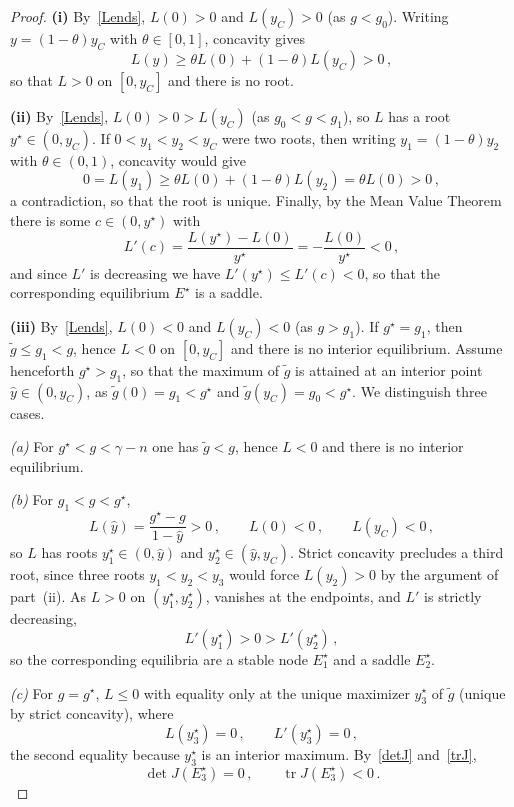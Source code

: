 \documentclass[10pt,a4paper]{amsart}
\begin{document}
\begin{proof}
{\bf (i)} By~\eqref{Lends}, $L(0)>0$ and $L(y_C)>0$ (as $g<g_0$). Writing $y=(1-\theta)y_C$ with $\theta\in[0,1]$, concavity gives
\[
L(y)\ge\theta L(0)+(1-\theta)L(y_C)>0\,,
\]
so that $L>0$ on $[0,y_C]$ and there is no root.

{\bf (ii)} By~\eqref{Lends}, $L(0)>0>L(y_C)$ (as $g_0<g<g_1$), so $L$ has a root $y^\star\in(0,y_C)$. If $0<y_1<y_2<y_C$ were two roots, then writing $y_1=(1-\theta)y_2$ with $\theta\in(0,1)$, concavity would give
\[
0=L(y_1)\ge\theta L(0)+(1-\theta)L(y_2)=\theta L(0)>0\,,
\]
a contradiction, so that the root is unique. Finally, by the Mean Value Theorem there is some $c\in(0,y^\star)$ with
\[
L'(c)=\frac{L(y^\star)-L(0)}{y^\star}=-\frac{L(0)}{y^\star}<0\,,
\]
and since $L'$ is decreasing we have $L'(y^\star)\le L'(c)<0$, so that the corresponding equilibrium $E^\star$ is a saddle.

{\bf (iii)} By~\eqref{Lends}, $L(0)<0$ and $L(y_C)<0$ (as $g>g_1$). If $g^\star=g_1$, then $\tilde g\le g_1<g$, hence $L<0$ on $[0,y_C]$ and there is no interior equilibrium. Assume henceforth $g^\star>g_1$, so that the maximum of $\tilde g$ is attained at an interior point $\hat y\in(0,y_C)$, as $\tilde g(0)=g_1<g^\star$ and $\tilde g(y_C)=g_0<g^\star$. We distinguish three cases.

\emph{(a)} For $g^\star<g<\gamma-n$ one has $\tilde g<g$, hence $L<0$ and there is no interior equilibrium.

\emph{(b)} For $g_1<g<g^\star$,
\[
L(\hat y)=\frac{g^\star-g}{1-\hat y}>0\,,\qquad L(0)<0\,,\qquad L(y_C)<0\,,
\]
so $L$ has roots $y_1^\star\in(0,\hat y)$ and $y_2^\star\in(\hat y,y_C)$. Strict concavity precludes a third root, since three roots $y_1<y_2<y_3$ would force $L(y_2)>0$ by the argument of part~(ii). As $L>0$ on $(y_1^\star,y_2^\star)$, vanishes at the endpoints, and $L'$ is strictly decreasing,
\[
L'(y_1^\star)>0>L'(y_2^\star)\,,
\]
so the corresponding equilibria are a stable node $E_1^\star$ and a saddle $E_2^\star$.

\emph{(c)} For $g=g^\star$, $L\le0$ with equality only at the unique maximizer $y_3^\star$ of $\tilde g$ (unique by strict concavity), where
\[
L(y_3^\star)=0\,,\qquad L'(y_3^\star)=0\,,
\]
the second equality because $y_3^\star$ is an interior maximum. By~\eqref{detJ} and~\eqref{trJ},
\[
\det J(E_3^\star)=0\,,\qquad \operatorname{tr}J(E_3^\star)<0\,.
\]
\end{proof}
\end{document}
